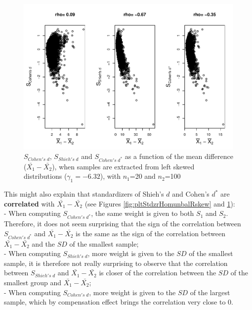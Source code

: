 \documentclass[
  english,
  man,mask]{apa6}
\begin{document}
\begin{figure}
\centering
\includegraphics{Correlation_files/figure-latex/pltStdzrHomunbalLskew-1.pdf}
\caption{\label{fig:pltStdzrHomunbalLskew}\(S_{Cohen's \; d}\), \(S_{Shieh's \; d}\) and \(S_{Cohen's \; d^*}\) as a function of the mean difference (\(\bar{X_1}-\bar{X_2}\)), when samples are extracted from left skewed distributions (\(\gamma_1 = -6.32\)), with \(n_1\)=20 and \(n_2\)=100}
\end{figure}

This might also explain that standardizers of Shieh's \(d\) and Cohen's \(d^*\) are \textbf{correlated} with \(\bar{X_1}-\bar{X_2}\) (see Figures \ref{fig:pltStdzrHomunbalRskew} and \ref{fig:pltStdzrHomunbalLskew}):\\
- When computing \(S_{Cohen's \; d^*}\), the same weight is given to both \(S_1\) and \(S_2\). Therefore, it does not seem surprising that the sign of the correlation between \(S_{Cohen's \; d^*}\) and \(\bar{X_1}-\bar{X_2}\) is the same as the sign of the correlation between \(\bar{X_1}-\bar{X_2}\) and the \(SD\) of the smallest sample;\\
- When computing \(S_{Shieh's \; d}\), more weight is given to the \(SD\) of the smallest sample, it is therefore not really surprising to observe that the correlation between \(S_{Shieh's \; d}\) and \(\bar{X_1}-\bar{X_2}\) is closer of the correlation between the \(SD\) of the smallest group and \(\bar{X_1}-\bar{X_2}\);\\
- When computing \(S_{Cohen's \; d}\), more weight is given to the \(SD\) of the largest sample, which by compensation effect brings the correlation very close to 0.
\end{document}
